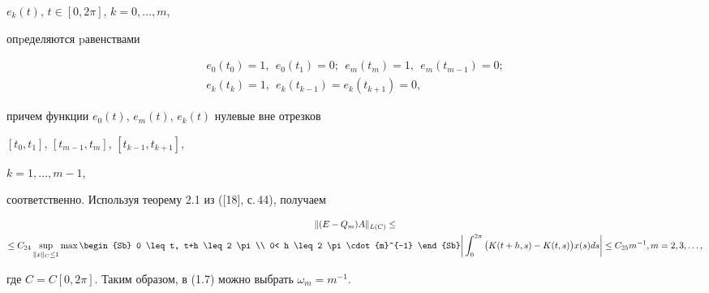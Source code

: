 $e_k(t)$, $t \in [0, 2\pi]$, $k=0,\dotsc, m$,


опpеделяются pавенствами 


\begin{gather*}


e_0(t_0)=1,\ \ e_0(t_1)=0;\ \ e_m(t_m)=1,\ \ e_m(t_{m-1})=0; \\


e_k(t_k)=1,\ \ e_k(t_{k-1})=e_k(t_{k+1})=0,


\end{gather*}


причем функции $e_0(t)$, $e_m(t)$, $e_k(t)$ нулевые вне отрезков


$[t_0, t_1]$, $[t_{m-1}, t_m]$, $[t_{k-1}, t_{k+1}]$,\linebreak


$k=1,\dotsc, m-1$,


соответственно. Используя теорему 2.1 из ([18], с.\,44), получаем


\begin{gather*}


\| (E-Q_m)A \|_{L(C)}\leq \\


%


\leq C_{24} \sup \limits_{\| x \|_C \leq 1}


\max\begin{Sb} 0 \leq t, t+h \leq 2 \pi \\


0< h \leq 2 \pi \cdot {m}^{-1} \end{Sb}


\bigg | \int^{2 \pi}_0 \big( K(t+h,s)-K(t,s) \big) x(s) ds


\bigg | \leq C_{25} m^{-1}, m=2, 3, \dotsc,


\end{gather*}


где $C=C[0,2\pi]$. Таким образом, в (1.7) можно выбрать $\omega_m=m^{-1}$.








